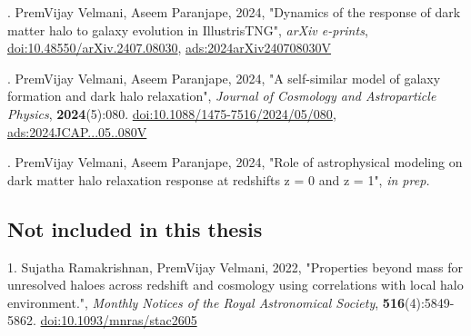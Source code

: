 \documentclass[a4paper, 12pt, oneside]{Thesis}  %
\newcommand{\doi}[1]{\href{https://doi.org/#1}{doi:#1}}
\begin{document}
. PremVijay Velmani, Aseem Paranjape, 2024, "Dynamics of the response of dark matter halo to galaxy evolution in IllustrisTNG", \textit{arXiv e-prints}, 
\doi{10.48550/arXiv.2407.08030}, 
\href{https://ui.adsabs.harvard.edu/abs/2024arXiv240708030V}{ads:2024arXiv240708030V}

\vspace{0.5cm}

. PremVijay Velmani, Aseem Paranjape, 2024, "A self-similar model of galaxy formation and dark halo relaxation", \textit{Journal of Cosmology and Astroparticle Physics}, 
\textbf{2024}(5):080. 
\doi{10.1088/1475-7516/2024/05/080},
\href{https://ui.adsabs.harvard.edu/abs/2024JCAP...05..080V}{ads:2024JCAP...05..080V}

\vspace{0.5cm}

. PremVijay Velmani, Aseem Paranjape, 2024, "Role of astrophysical modeling on dark matter halo relaxation response at redshifts z = 0 and z = 1", \textit{in prep.}

\subsection*{Not included in this thesis}

1. Sujatha Ramakrishnan, PremVijay Velmani, 2022, "Properties beyond mass
for unresolved haloes across redshift and cosmology using correlations with local halo environment.", \textit{Monthly Notices of the Royal Astronomical Society}, 
\textbf{516}(4):5849-5862. 
\doi{10.1093/mnras/stac2605}


\tableofcontents  %

\listoffigures  %

\listoftables  %










\mainmatter	  %
\pagestyle{fancy}  %

\fancyhead[L]{\emph{\leftmark}}
\renewcommand{\chaptermark}[1]{\markboth{#1}{}}













\appendix %




\backmatter

\label{Bibliography}

\end{document}
